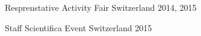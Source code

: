 

\begin{cvhonors}

  \cvhonor
    {Resprenstative} %
    {Activity Fair} %
    {Switzerland} %
    {2014, 2015} %

  \cvhonor
    {Staff} %
    {Scientifica Event} %
    {Switzerland} %
    {2015} %

\end{cvhonors}
